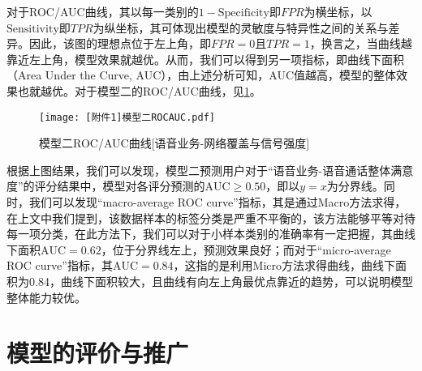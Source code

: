 \documentclass{MathorCupmodeling}
\begin{document}
\begin{itemize}
		对于ROC/AUC曲线，其以每一类别的$1-\mathrm{Specificity}$即$FPR$为横坐标，以$\mathrm{Sensitivity}$即$TPR$为纵坐标，其可体现出模型的灵敏度与特异性之间的关系与差异。因此，该图的理想点位于左上角，即$FPR=0$且$TPR=1$，换言之，当曲线越靠近左上角，模型效果就越优。从而，我们可以得到另一项指标，即曲线下面积（Area Under the Curve, AUC），由上述分析可知，AUC值越高，模型的整体效果也就越优。对于模型二的ROC/AUC曲线，见\textcolor{blue}{\cref{fig:SecondModelROCAUC}}。
		\begin{figure}[H]
			\centerline{\texttt{[image: [附件1]模型二ROCAUC.pdf]}}
			\caption{模型二ROC/AUC曲线[语音业务-网络覆盖与信号强度]}\label{fig:SecondModelROCAUC}
		\end{figure}
		根据上图结果，我们可以发现，模型二预测用户对于“语音业务-语音通话整体满意度”的评分结果中，模型对各评分预测的$\mathrm{AUC}\geqslant0.50$，即以$y=x$为分界线。同时，我们可以发现“macro-average ROC curve”指标，其是通过Macro方法求得，在上文中我们提到，该数据样本的标签分类是严重不平衡的，该方法能够平等对待每一项分类，在此方法下，我们可以对于小样本类别的准确率有一定把握，其曲线下面积$\mathrm{AUC}=0.62$，位于分界线左上，预测效果良好；而对于“micro-average ROC curve”指标，其$\mathrm{AUC}=0.84$，这指的是利用Micro方法求得曲线，曲线下面积为0.84，曲线下面积较大，且曲线有向左上角最优点靠近的趋势，可以说明模型整体能力较优。
	\end{itemize}

	\section{模型的评价与推广}
\end{document}
